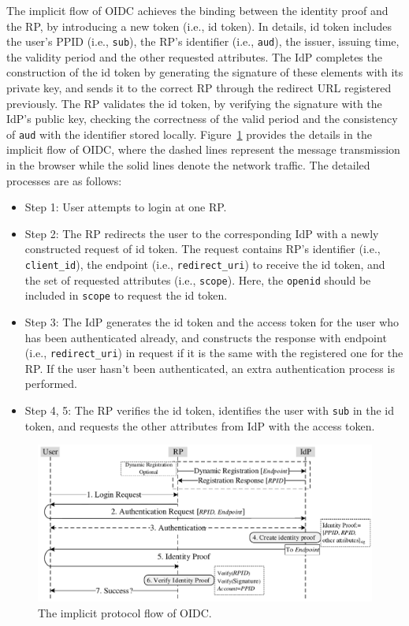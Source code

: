 The implicit flow of OIDC achieves the binding between the identity proof and the RP, by introducing a new token (i.e., id token). In details, id token includes the user's PPID (i.e., \verb+sub+), the RP's identifier (i.e., \verb+aud+), the issuer, issuing time, the validity period and the other requested attributes. The IdP completes the construction of the id token by generating the signature of these elements with its private key, and sends it to the correct RP through the redirect URL registered previously.  The RP validates the id token, by verifying the signature with the IdP's public key, checking the correctness of the valid period and the consistency of \verb+aud+ with the identifier stored locally. Figure~\ref{fig:OpenID} provides the details in the implicit flow of OIDC, where the dashed lines represent the message transmission  in  the browser while the solid lines denote the network traffic. The detailed processes are as follows:
\begin{itemize}
    \item Step 1: User attempts to login at one RP.
    \item Step 2: The RP redirects the user to the corresponding IdP with a newly constructed request of id token. The request contains RP's identifier (i.e., \verb+client_id+), the endpoint (i.e., \verb+redirect_uri+) to receive the id token, and the set of requested attributes (i.e., \verb+scope+). Here, the \verb+openid+ should be included in \verb+scope+ to request the id token.
    \item Step 3: The IdP generates the id token and the access token for the user who has been authenticated already, and constructs the response with  endpoint (i.e., \verb+redirect_uri+)  in request if it is the same with the registered one for the RP. If the user hasn't been authenticated, an extra authentication process is performed.
    \item Step 4, 5: The RP verifies the id token, identifies the user with \verb+sub+ in the id token, and requests the other attributes from IdP with the access token.
\end{itemize}
\begin{figure}
  \centering
  \includegraphics[width=\linewidth]{fig/OIDC.pdf}
  \caption{The implicit protocol flow of OIDC.}
  \label{fig:OpenID}
\end{figure}

